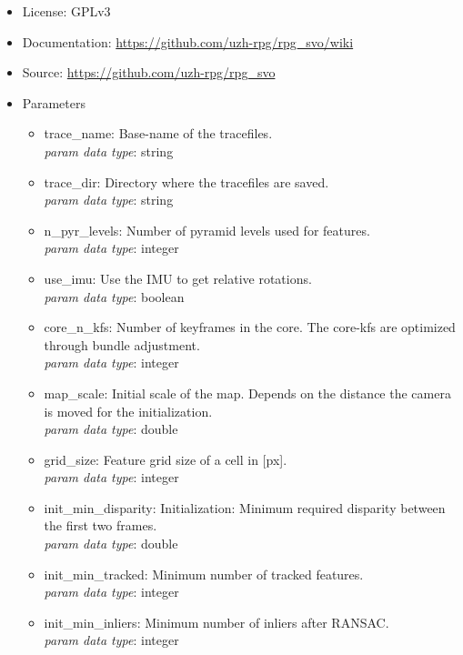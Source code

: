 \begin{itemize}
\item License: GPLv3
\item Documentation: \url{https://github.com/uzh-rpg/rpg_svo/wiki}
\item Source: \url{https://github.com/uzh-rpg/rpg_svo}
\item Parameters
\begin{itemize}
\item trace\_name: Base-name of the tracefiles. \\
\textit{param data type}: string

\item trace\_dir: Directory where the tracefiles are saved.	 \\
\textit{param data type}: string

\item n\_pyr\_levels: Number of pyramid levels used for features.	 \\
\textit{param data type}: integer

\item use\_imu: Use the IMU to get relative rotations. \\
\textit{param data type}: boolean

\item core\_n\_kfs:	Number of keyframes in the core. The core-kfs are optimized through bundle adjustment. \\
\textit{param data type}: integer

\item map\_scale: Initial scale of the map. Depends on the distance the camera is moved for the initialization.	 \\
\textit{param data type}: double

\item grid\_size: Feature grid size of a cell in [px].	 \\
\textit{param data type}: integer

\item init\_min\_disparity: Initialization: Minimum required disparity between the first two frames.	 \\
\textit{param data type}: double

\item init\_min\_tracked: Minimum number of tracked features.	 \\
\textit{param data type}: integer

\item init\_min\_inliers: Minimum number of inliers after RANSAC.	 \\
\textit{param data type}: integer


\end{itemize}
\end{itemize}
